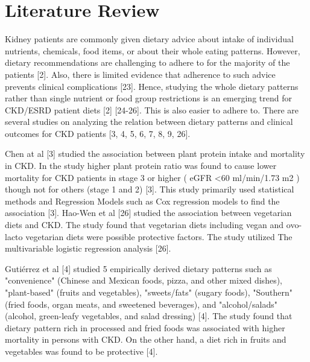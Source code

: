 \section{Literature Review}

\medskip
Kidney patients are commonly given dietary advice about intake of individual nutrients, chemicals, food items, or about their whole eating patterns. However, dietary recommendations are challenging to adhere to for the majority of the patients [2]. Also, there is limited evidence that adherence to such advice prevents clinical complications [23]. Hence, studying the whole dietary patterns rather than single nutrient or food group restrictions is an emerging trend for CKD/ESRD patient diets [2] [24-26]. This is also easier to adhere to. There are several studies on analyzing the relation between dietary patterns and clinical outcomes for CKD patients [3, 4, 5, 6, 7, 8, 9, 26].

\medskip
\noindent Chen at al [3] studied the association between plant protein intake and mortality in CKD. In the study higher plant protein ratio was found to cause lower mortality for CKD patients in stage 3 or higher ( eGFR  \textless 60 ml/min/1.73 m2 ) though not for others (stage 1 and 2) [3]. This study primarily used statistical methods and Regression Models such as Cox regression models to find the association [3]. Hao-Wen et al [26] studied the association between vegetarian diets and CKD. The study found that vegetarian diets including vegan and ovo-lacto vegetarian diets were possible protective factors. The study utilized The multivariable logistic regression analysis [26].

\medskip
\noindent Gutiérrez et al [4] studied 5 empirically derived dietary patterns such as "convenience" (Chinese and Mexican foods, pizza, and other mixed dishes), "plant-based" (fruits and vegetables), "sweets/fats" (sugary foods), "Southern" (fried foods, organ meats, and sweetened beverages), and "alcohol/salads" (alcohol, green-leafy vegetables, and salad dressing) [4]. The study found that dietary pattern rich in processed and fried foods was associated with higher mortality in persons with CKD. On the other hand, a diet rich in fruits and
vegetables was found to be protective [4].

